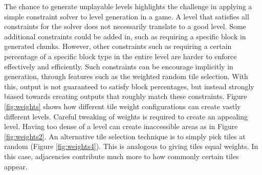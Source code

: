 The chance to generate unplayable levels highlights the challenge in applying a simple constraint solver to level generation in a game. A level that satisfies all constraints for the solver does not necessarily translate to a good level. Some additional constraints could be added in, such as requiring a specific block in generated chunks. However, other constraints such as requiring a certain percentage of a specific block type in the entire level are harder to enforce effectively and efficiently. Such constraints can be encourage implicitly in generation, through features such as the weighted random tile selection. With this, output is not guaranteed to satisfy block percentages, but instead strongly biased towards creating outputs that roughly match these constraints. Figure \ref{fig:weights} shows how different tile weight configurations can create vastly different levels. Careful tweaking of weights is required to create an appealing level. Having too dense of a level can create inaccessible areas as in Figure \ref{fig:weights2}. An alternative tile selection technique is to simply pick tiles at random (Figure \ref{fig:weights4}). This is analogous to giving tiles equal weights. In this case, adjacencies contribute much more to how commonly certain tiles appear.

